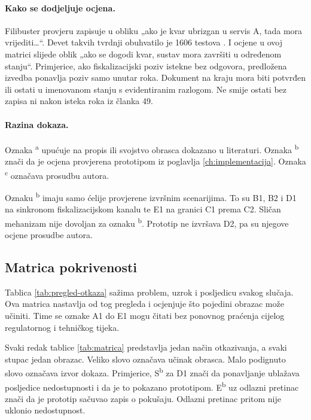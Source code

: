 \paragraph{Kako se dodjeljuje ocjena.}
Filibuster provjeru zapisuje u obliku „ako je kvar ubrizgan u servis A, tada
mora vrijediti\ldots“. Devet takvih tvrdnji obuhvatilo je 1606 testova
\cite{meiklejohn2021filibuster}. I ocjene u ovoj matrici slijede oblik
„ako se dogodi kvar, sustav mora završiti u određenom stanju“. Primjerice,
ako fiskalizacijski poziv istekne bez odgovora, predložena izvedba ponavlja
poziv samo unutar roka. Dokument na kraju mora biti potvrđen ili ostati u
imenovanom stanju s evidentiranim razlogom. Ne smije ostati bez zapisa ni
nakon isteka roka iz članka 49.

\paragraph{Razina dokaza.}
Oznaka \textsuperscript{a} upućuje na propis ili svojstvo obrasca dokazano u
literaturi. Oznaka \textsuperscript{b} znači da je ocjena provjerena
prototipom iz poglavlja \ref{ch:implementacija}. Oznaka
\textsuperscript{c} označava prosudbu autora.

Oznaku \textsuperscript{b} imaju samo ćelije provjerene izvršnim scenarijima.
To su B1, B2 i D1 na sinkronom fiskalizacijskom kanalu te E1 na granici C1
prema C2. Sličan mehanizam nije dovoljan za oznaku \textsuperscript{b}.
Prototip ne izvršava D2, pa su njegove ocjene prosudbe autora.

\clearpage
\subsection{Matrica pokrivenosti}
\label{sec:matrica}

Tablica \ref{tab:pregled-otkaza} sažima problem, uzrok i posljedicu svakog
slučaja. Ova matrica nastavlja od tog pregleda i ocjenjuje što pojedini
obrazac može učiniti. Time se oznake A1 do E1 mogu čitati bez ponovnog
praćenja cijelog regulatornog i tehničkog tijeka.

Svaki redak tablice \ref{tab:matrica} predstavlja jedan način otkazivanja, a
svaki stupac jedan obrazac. Veliko slovo označava učinak obrasca. Malo
podignuto slovo označava izvor dokaza. Primjerice,
S\textsuperscript{b} za D1 znači da ponavljanje ublažava posljedice
nedostupnosti i da je to pokazano prototipom. E\textsuperscript{b} uz
odlazni pretinac znači da je prototip sačuvao zapis o pokušaju. Odlazni
pretinac pritom nije uklonio nedostupnost.


